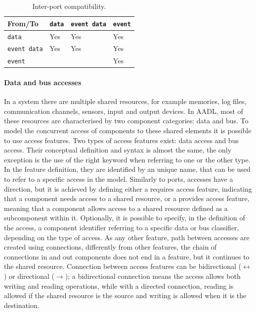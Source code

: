 \begin{table}
    \myfloatalign
    \begin{tabularx}{\textwidth}{X X X X}
        \toprule
        From/To  & \texttt{data} & \texttt{event data} & \texttt{event}   \\
        \midrule
        \texttt{data}  & Yes & Yes & Yes   \\
        \texttt{event data}  & Yes & Yes & Yes   \\
        \texttt{event}  &  &  & Yes   \\
        \bottomrule
    \end{tabularx}
    \caption[Inter-port compatibility]{Inter-port compatibility.}  \label{tab:ports}
\end{table}

\paragraph{Data and bus accesses}
In a system there are multiple shared resources, for example memories, log files, communication channels, sensors, input and output devices. In AADL, most of these resources are characterised by two component categories: data and bus. To model the concurrent access of components to these shared elements it is possible to use access features. Two types of access features exist: data access and bus access. Their conceptual definition and syntax is almost the same, the only exception is the use of the right keyword when referring to one or the other type. In the feature definition, they are identified by an unique name, that can be used to refer to a specific access in the model. Similarly to ports, accesses have a direction, but it is achieved by defining either  a requires access feature, indicating that a component needs access to a shared resource, or a provides access feature, meaning that a component allows access to a shared resource defined as a subcomponent within it. Optionally, it is possible to specify, in the definition of the access, a component identifier referring to a specific data or bus classifier, depending on the type of access. As any other feature, path between accesses are created using connections, differently from other features, the chain of connections in and out components does not end in a feature, but it continues to the shared resource. Connection between access features can be bidirectional ($\leftrightarrow$) or directional ($\rightarrow$); a bidirectional connection means the access allows both writing and reading operations, while with a directed connection, reading is allowed if the shared resource is the source and writing is allowed when it is the destination.

